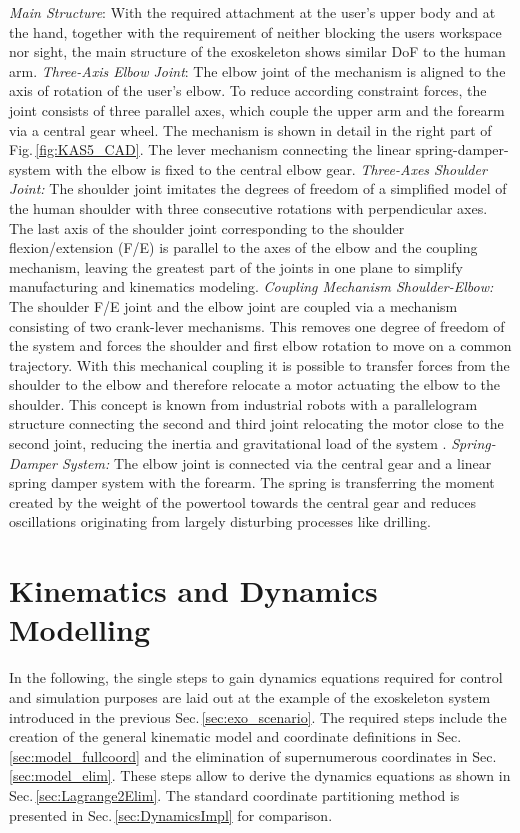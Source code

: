 \documentclass{svproc}
\begin{document}
\emph{Main Structure}:
%
With the required attachment at the user's upper body and at the hand, together with the requirement of neither blocking the users workspace nor sight, the main structure of the exoskeleton shows similar DoF to the human arm.
%
\emph{Three-Axis Elbow Joint}:
The elbow joint of the mechanism is aligned to the axis of rotation of the user's elbow.
To reduce according constraint forces, the joint consists of three parallel axes, which couple the upper arm and the forearm via a central gear wheel.
The mechanism is shown in detail in the right part of Fig.\,\ref{fig:KAS5_CAD}.
The lever mechanism connecting the linear spring-damper-system with the elbow is fixed to the central elbow gear.
%
\emph{Three-Axes Shoulder Joint:}
The shoulder joint imitates the degrees of freedom of a simplified model of the human shoulder with three consecutive rotations with perpendicular axes.
The last axis of the shoulder joint corresponding to the shoulder flexion/extension (F/E) is parallel to the axes of the elbow and the coupling mechanism, leaving the greatest part of the joints in one plane to simplify manufacturing and kinematics modeling.
%
\emph{Coupling Mechanism Shoulder-Elbow:}
%
The shoulder F/E joint and the elbow joint are coupled via a mechanism consisting of two crank-lever mechanisms.
This removes one degree of freedom of the system and forces the shoulder and first elbow rotation to move on a common trajectory.
With this mechanical coupling it is possible to transfer forces from the shoulder to the elbow and therefore relocate a motor actuating the elbow to the shoulder.
This concept is known from industrial robots with a parallelogram structure connecting the second and third joint relocating the motor close to the second joint, reducing the inertia and gravitational load of the system \cite{LuhZhe1985}.
%
\emph{Spring-Damper System:}
%
The elbow joint is connected via the central gear and a linear spring damper system with the forearm.
The spring is transferring the moment created by the weight of the powertool towards the central gear and reduces oscillations originating from largely disturbing processes like drilling.

\section{Kinematics and Dynamics Modelling}
\label{sec:model}

In the following, the single steps to gain dynamics equations required for control and simulation purposes are laid out at the example of the exoskeleton system introduced in the previous Sec.\,\ref{sec:exo_scenario}.
The required steps include the creation of the general kinematic model and coordinate definitions in Sec.\,\ref{sec:model_fullcoord} and the elimination of supernumerous coordinates in Sec.\,\ref{sec:model_elim}.
These steps allow to derive the dynamics equations as shown in Sec.\,\ref{sec:Lagrange2Elim}.
The standard coordinate partitioning method is presented in Sec.\,\ref{sec:DynamicsImpl} for comparison.
\end{document}
